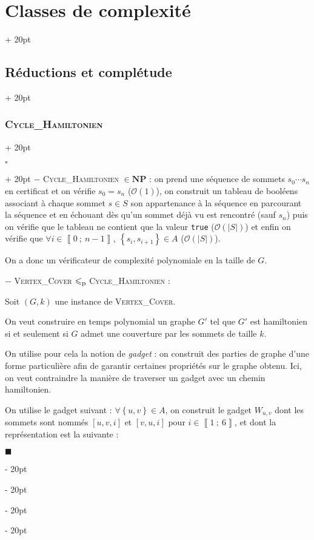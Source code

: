 \documentclass[a4paper, 12pt, twoside]{article}
\newcommand{\nset}[2]{\left\llbracket #1\ ;\ #2 \right\rrbracket}
\newcommand{\set}[1]{\left\{ #1 \right\}}
\newcommand{\abs}[1]{\left\lvert #1 \right\rvert}
\renewcommand{\le}{\leqslant}
\newcommand{\ind}[1][20pt]{\advance\leftskip + #1}
\newcommand{\deind}[1][20pt]{\advance\leftskip - #1}
\newenvironment{indt}[2][20pt]{#2 \par \ind[#1]}{\par \deind} %
\newenvironment{proof}[1][{}]{\begin{indt}{$\square$ #1}}{$\blacksquare$ \end{indt}}
\begin{document}
\begin{indt}{\section{Classes de complexité}}
\begin{indt}{\subsection{Réductions et complétude}}
\begin{indt}{\subsubsection{\textsc{Cycle\_Hamiltonien}}}
                \vspace{6pt}
                
                \begin{proof}
                    $-$ \textsc{Cycle\_Hamiltonien} $\in \mathbf{NP}$ : on prend une séquence de sommets $s_0 \cdots s_n$ en certificat et on vérifie $s_0 = s_n$ ($\mathcal O(1)$), on construit un tableau de booléens associant à chaque sommet $s \in S$ son appartenance à la séquence en parcourant la séquence et en échouant dès qu'un sommet déjà vu est rencontré (sauf $s_n$) puis on vérifie que le tableau ne contient que la valeur \texttt{true} ($\mathcal O(\abs S)$) et enfin on vérifie que $\forall i \in \nset 0 {n - 1},\ \set{s_i, s_{i + 1}} \in A$ ($\mathcal O(\abs S)$).

                    On a donc un vérificateur de complexité polynomiale en la taille de $G$.

                    \vspace{12pt}
                    
                    $-$ \textsc{Vertex\_Cover} $\le_{\rm p}$ \textsc{Cycle\_Hamiltonien} :

                    Soit $(G, k)$ une instance de \textsc{Vertex\_Cover}.

                    On veut construire en temps polynomial un graphe $G'$ tel que $G'$ est hamiltonien si et seulement si $G$ admet une couverture par les sommets de taille $k$.

                    \vspace{6pt}
                    
                    On utilise pour cela la notion de \emph{gadget} : on construit des parties de graphe d'une forme particulière afin de garantir certaines propriétés sur le graphe obtenu. Ici, on veut contraindre la manière de traverser un gadget avec un chemin hamiltonien.

                    On utilise le gadget suivant : $\forall \set{u, v} \in A$, on construit le gadget $W_{u, v}$ dont les sommets sont nommés $[u, v, i]$ et $[v, u, i]$ pour $i \in \nset 1 6$, et dont la représentation est la suivante :

                    \begin{center}
\end{center}
\end{proof}
\end{indt}
\end{indt}
\end{indt}
\end{document}
